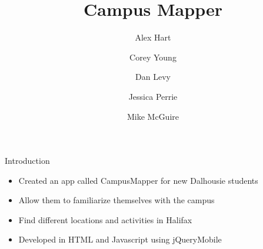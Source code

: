 \documentclass{beamer}
\title{Campus Mapper}
\author{Alex Hart\and Corey Young\and Dan Levy\and Jessica Perrie\and Mike McGuire}
\begin{document}
\begin{frame}
    \maketitle
\end{frame}

\begin{frame}{Introduction}
\begin{itemize}
    \item Created an app called CampusMapper for new Dalhousie students 
    \item Allow them to familiarize themselves with the campus
    \item Find different locations and activities in Halifax
    \item Developed in HTML and Javascript using jQueryMobile 
\end{itemize}
\end{frame}
\end{document}
